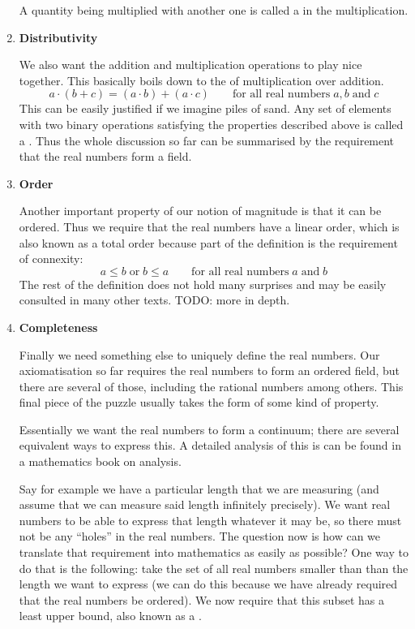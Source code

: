 \begin{enumerate}
A quantity being multiplied with another one is called a  in the multiplication.

\item \textbf{Distributivity}

We also want the addition and multiplication operations to play nice together. This basically boils down to the  of multiplication over addition.
\[ a\cdot (b+c) = (a\cdot b) + (a\cdot c) \qquad \text{for all real numbers} \; a,b \;\text{and}\; c \]
This can be easily justified if we imagine piles of sand. Any set of elements with two binary operations satisfying the properties described above is called a . Thus the whole discussion so far can be summarised by the requirement that the real numbers form a field.

\item \textbf{Order}

Another important property of our notion of magnitude is that it can be ordered. Thus we require that the real numbers have a linear order, which is also known as a total order because part of the definition is the requirement of connexity:
\[ a \leq b \;\text{or}\; b \leq a \qquad \text{for all real numbers}\; a \; \text{and}\; b \]
The rest of the definition does not hold many surprises and may be easily consulted in many other texts. TODO: more in depth.

\item \textbf{Completeness}

Finally we need something else to uniquely define the real numbers. Our axiomatisation so far requires the real numbers to form an ordered field, but there are several of those, including the rational numbers among others. This final piece of the puzzle usually takes the form of some kind of  property. 

Essentially we want the real numbers to form a continuum; there are several equivalent ways to express this. A detailed analysis of this is can be found in a mathematics book on analysis.

Say for example we have a particular length that we are measuring (and assume that we can measure said length infinitely precisely). We want real numbers to be able to express that length whatever it may be, so there must not be any ``holes'' in the real numbers. The question now is how can we translate that requirement into mathematics as easily as possible? One way to do that is the following: take the set of all real numbers smaller than than the length we want to express (we can do this because we have already required that the real numbers be ordered). We now require that this subset has a least upper bound, also known as a . 


\end{enumerate}
